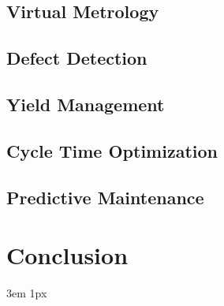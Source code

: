 \documentclass{Academic}
\begin{document}
    \subsection{Virtual Metrology}

    \subsection{Defect Detection}

    \subsection{Yield Management}

    \subsection{Cycle Time Optimization}

    \subsection{Predictive Maintenance}

    \section{Conclusion}

    \singlespacing
    \emergencystretch 3em
    \hfuzz 1px
    \printbibliography[heading=bibnumbered]




\end{document}
